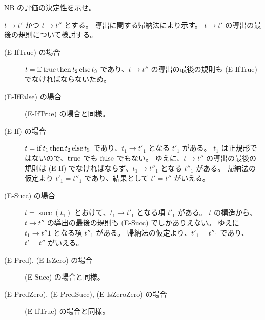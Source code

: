 \begin{jexercise*}[3.5.14.]
  NB の評価の決定性を示せ。
\end{jexercise*}
\begin{jproof}
  $t \to t'$ かつ $t \to t''$ とする。
  導出に関する帰納法により示す。
  $t \to t'$ の導出の最後の規則について検討する。
  \begin{description}
    \item[(E-IfTrue) の場合]
      $t = \operatorname{if} \operatorname{true} \operatorname{then} t_2 \operatorname{else} t_3$ であり、$t \to t''$ の導出の最後の規則も (E-IfTrue) でなければならないため。
    \item[(E-IfFalse) の場合]
      (E-IfTrue) の場合と同様。
    \item[(E-If) の場合]
      $t = \operatorname{if} t_1 \operatorname{then} t_2 \operatorname{else} t_3$ であり、$t_1 \to t'_1$ となる $t'_1$ がある。
      $t_1$ は正規形ではないので、$\operatorname{true}$ でも $\operatorname{false}$ でもない。
      ゆえに、$t \to t''$ の導出の最後の規則は (E-If) でなければならず、$t_1 \to t''_1$ となる $t''_1$ がある。
      帰納法の仮定より $t'_1 = t''_1$ であり、結果として $t' = t''$ がいえる。
    \item[(E-Succ) の場合]
      $t = \operatorname{succ}(t_1)$ とおけて、$t_1 \to t'_1$ となる項 $t'_1$ がある。
      $t$ の構造から、$t \to t''$ の導出の最後の規則も (E-Succ) でしかありえない。
      ゆえに $t_1 \to t''1$ となる項 $t''_1$ がある。
      帰納法の仮定より、$t'_1 = t''_1$ であり、$t' = t''$ がいえる。
    \item[(E-Pred), (E-IsZero) の場合]
      (E-Succ) の場合と同様。
    \item[(E-PredZero), (E-PredSucc), (E-IsZeroZero) の場合]
      (E-IfTrue) の場合と同様。
  \end{description}
\end{jproof}

